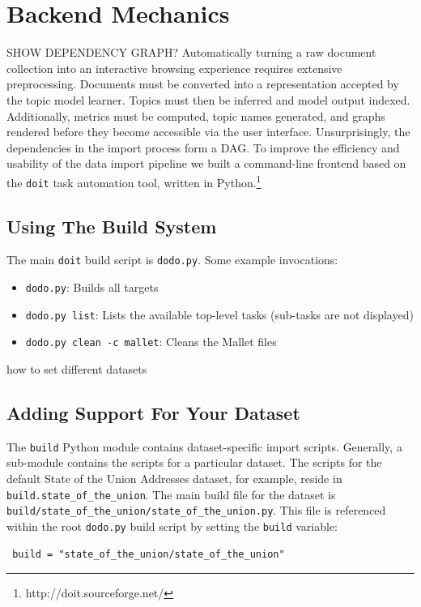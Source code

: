 \documentclass[a4paper,10pt]{article}
\begin{document}
\section{Backend Mechanics}
SHOW DEPENDENCY GRAPH?
Automatically turning a raw document collection into an interactive browsing
experience requires extensive preprocessing. Documents must be converted into a
representation accepted by the topic model learner. Topics must then be inferred
and model output indexed. Additionally, metrics must be computed, topic names
generated, and graphs rendered before they become accessible via the user
interface. Unsurprisingly, the dependencies in the import process form a DAG. To
improve the efficiency and usability of the data import pipeline we built a
command-line frontend based on the \verb/doit/ task automation tool, written in
Python.\footnote{http://doit.sourceforge.net/}

\subsection{Using The Build System}
The main \verb/doit/ build script is \verb/dodo.py/. Some example invocations:
\begin{itemize}
 \item \verb/dodo.py/: Builds all targets
 \item \verb/dodo.py list/: Lists the available top-level tasks (sub-tasks are not displayed)
 \item \verb/dodo.py clean -c mallet/: Cleans the Mallet files

\end{itemize}

%

how to set different datasets

\subsection{Adding Support For Your Dataset}
The \verb/build/ Python module contains dataset-specific import scripts. Generally, a sub-module contains the scripts for a particular dataset. The scripts for the default State of the Union Addresses dataset, for example, reside in \verb/build.state_of_the_union/. The main build file for the dataset is \verb#build/state_of_the_union/state_of_the_union.py#. This file is referenced within the root \verb/dodo.py/ build script by setting the \verb/build/ variable:
\begin{verbatim}
 build = "state_of_the_union/state_of_the_union"
\end{verbatim}
\end{document}
